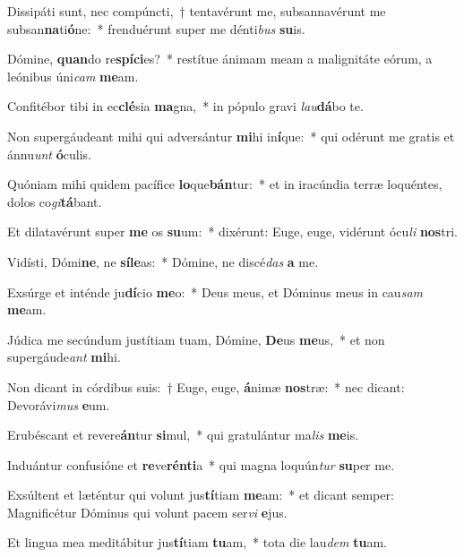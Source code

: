 \item Dissipáti sunt, nec compúncti,~† tentavérunt me, subsannavérunt me subsan\textbf{na}ti\textbf{ó}ne:~* frenduérunt super me dénti\textit{bus} \textbf{su}is.
\item Dómine, \textbf{quan}do re\textbf{spí}\textbf{ci}es?~* restítue ánimam meam a malignitáte eórum, a leónibus úni\textit{cam} \textbf{me}am.
\item Confitébor tibi in ec\textbf{clé}sia \textbf{ma}gna,~* in pópulo gravi \textit{lau}\textbf{dá}bo te.
\item Non supergáudeant mihi qui adversántur \textbf{mi}hi in\textbf{í}que:~* qui odérunt me gratis et ánnu\textit{unt} \textbf{ó}culis.
\item Quóniam mihi quidem pacífice \textbf{lo}que\textbf{bán}tur:~* et in iracúndia terræ loquéntes, dolos co\textit{gi}\textbf{tá}bant.
\item Et dilatavérunt super \textbf{me} os \textbf{su}um:~* dixérunt: Euge, euge, vidérunt ócu\textit{li} \textbf{nos}tri.
\item Vidísti, Dómi\textbf{ne}, ne \textbf{sí}\textbf{le}as:~* Dómine, ne discé\textit{das} \textbf{a} me.
\item Exsúrge et inténde ju\textbf{dí}cio \textbf{me}o:~* Deus meus, et Dóminus meus in cau\textit{sam} \textbf{me}am.
\item Júdica me secúndum justítiam tuam, Dómine, \textbf{De}us \textbf{me}us,~* et non supergáude\textit{ant} \textbf{mi}hi.
\item Non dicant in córdibus suis:~† Euge, euge, \textbf{á}nimæ \textbf{nos}træ:~* nec dicant: Devorávi\textit{mus} \textbf{e}um.
\item Erubéscant et revere\textbf{án}tur \textbf{si}mul,~* qui gratulántur ma\textit{lis} \textbf{me}is.
\item Induántur confusióne et \textbf{re}ve\textbf{rén}\textbf{ti}a~* qui magna loquún\textit{tur} \textbf{su}per me.
\item Exsúltent et læténtur qui volunt jus\textbf{tí}tiam \textbf{me}am:~* et dicant semper: Magnificétur Dóminus qui volunt pacem ser\textit{vi} \textbf{e}jus.
\item Et lingua mea meditábitur jus\textbf{tí}tiam \textbf{tu}am,~* tota die lau\textit{dem} \textbf{tu}am.

